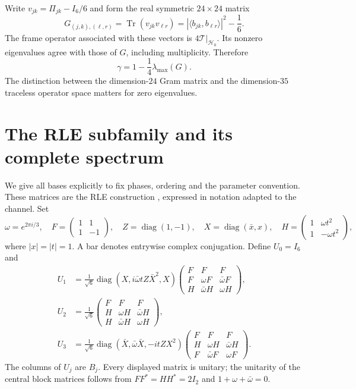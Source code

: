 \documentclass[11pt,a4paper]{article}
\theoremstyle{remark}
\DeclareMathOperator{\Tr}{Tr}
\DeclareMathOperator{\diag}{diag}
\newcommand{\T}{\mathcal T}
\newcommand{\HH}{\mathcal H_0}
\begin{document}
Write $v_{jk}=\Pi_{jk}-I_6/6$ and form the real symmetric $24\times24$ matrix
\begin{equation}\label{eq:gram}
 G_{(j,k),(\ell,r)}=\Tr(v_{jk}v_{\ell r})
       =|\langle b_{jk},b_{\ell r}\rangle|^2-\frac16.
\end{equation}
The frame operator associated with these vectors is $4\T|_{\HH}$. Its nonzero eigenvalues agree with those of $G$, including multiplicity. Therefore
\begin{equation}\label{eq:gramgap}
 \gamma=1-\frac14\lambda_{\max}(G).
\end{equation}
The distinction between the dimension-$24$ Gram matrix and the dimension-$35$ traceless operator space matters for zero eigenvalues.

\section{The RLE subfamily and its complete spectrum}
We give all bases explicitly to fix phases, ordering and the parameter convention. These matrices are the RLE construction \cite[Eqs.~(5)--(7)]{rle}, expressed in notation adapted to the channel.
Set
\[
 \omega=e^{2\pi i/3},\quad
 F=\begin{pmatrix}1&1\\1&-1\end{pmatrix},\quad
 Z=\diag(1,-1),\quad X=\diag(\bar x,x),\quad
 H=\begin{pmatrix}1&\omega t^2\\1&-\omega t^2\end{pmatrix},
\]
where $|x|=|t|=1$. A bar denotes entrywise complex conjugation. Define $U_0=I_6$ and
\begin{align}
 U_1&=\frac1{\sqrt6}\diag\!\left(X,i\bar\omega tZ\bar X^2,X\right)
 \begin{pmatrix}F&F&F\\ F&\omega F&\bar\omega F\\ H&\bar\omega H&\omega H\end{pmatrix},\label{eq:u1}\\
 U_2&=\frac1{\sqrt6}
 \begin{pmatrix}F&F&F\\ H&\omega H&\bar\omega H\\ H&\bar\omega H&\omega H\end{pmatrix},\label{eq:u2}\\
 U_3&=\frac1{\sqrt6}\diag\!\left(\bar X,\bar\omega\bar X,-itZX^2\right)
 \begin{pmatrix}F&F&F\\ H&\omega H&\bar\omega H\\ F&\bar\omega F&\omega F\end{pmatrix}.\label{eq:u3}
\end{align}
The columns of $U_j$ are $B_j$. Every displayed matrix is unitary; the unitarity of the central block matrices follows from $FF^*=HH^*=2I_2$ and $1+\omega+\bar\omega=0$.
\end{document}
